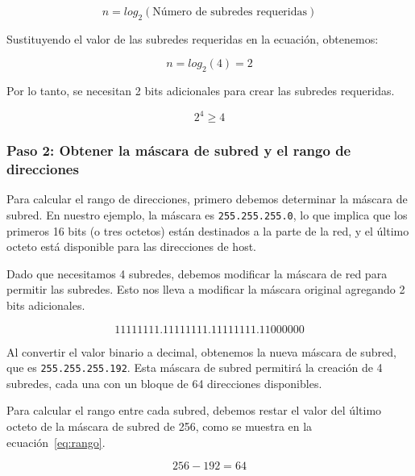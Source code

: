     \begin{equation} 
        n = log_{2}(\text{Número de subredes requeridas})
    \end{equation}

    Sustituyendo el valor de las subredes requeridas en la ecuación, obtenemos:

    \begin{equation} 
        n = log_{2}(4) = 2
    \end{equation}

    Por lo tanto, se necesitan 2 bits adicionales para crear las subredes requeridas.

    \begin{equation} 
        2^{4} \geq 4 \label{eq:numeroseb} 
    \end{equation}

    \subsubsection*{Paso 2: Obtener la máscara de subred y el rango de direcciones}

    Para calcular el rango de direcciones, primero debemos determinar la máscara de subred. En nuestro ejemplo, la máscara es \texttt{255.255.255.0}, lo que implica que los primeros 16 bits (o tres octetos) están destinados a la parte de la red, y el último octeto está disponible para las direcciones de host.

    Dado que necesitamos 4 subredes, debemos modificar la máscara de red para permitir las subredes. Esto nos lleva a modificar la máscara original agregando 2 bits adicionales. 
    
    \begin{equation*} 
        1111 1111.1111 1111.1111 1111.1100 0000 
    \end{equation*}

    Al convertir el valor binario a decimal, obtenemos la nueva máscara de subred, que es \texttt{255.255.255.192}. Esta máscara de subred permitirá la creación de 4 subredes, cada una con un bloque de 64 direcciones disponibles.
    
    Para calcular el rango entre cada subred, debemos restar el valor del último octeto de la máscara de subred de 256, como se muestra en la ecuación~\ref{eq:rango}.
    
    \begin{equation} 
        \label{eq:rango}
        256 - 192 = 64 
    \end{equation}
    
